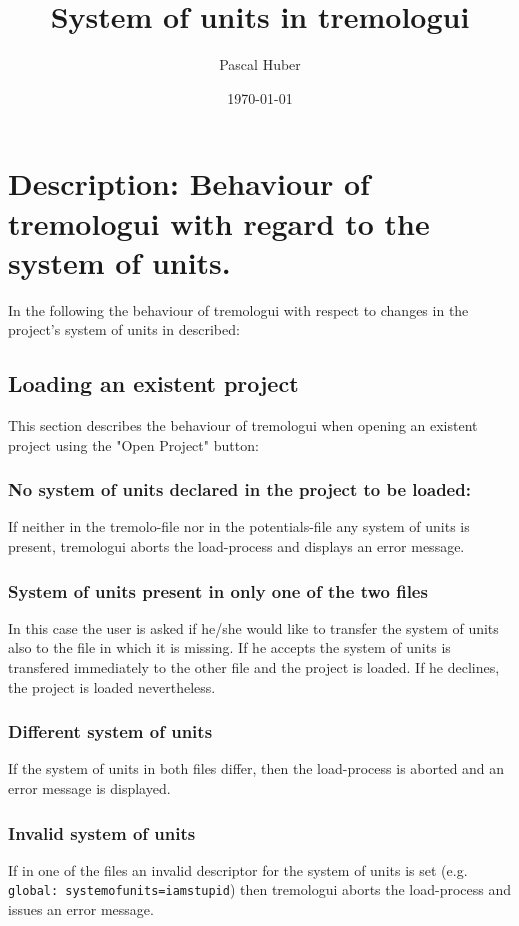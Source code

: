 \documentclass[11pt]{article}
\author{Pascal Huber}
\date{\today}
\title{System of units in tremologui}
\begin{document}
\maketitle
\tableofcontents

\section{Description: Behaviour of tremologui with regard to the system of units.}
\label{sec-1}
In the following the behaviour of tremologui with respect to changes in the
project's system of units in described:
\subsection{Loading an existent project}
\label{sec-1-1}
This section describes the behaviour of tremologui when opening an existent
project using the "Open Project" button:
\subsubsection{No system of units declared in the project to be loaded:}
\label{sec-1-1-1}
If neither in the tremolo-file nor in the potentials-file any system of units is
present, tremologui aborts the load-process and displays an error message.
\subsubsection{System of units present in only one of the two files}
\label{sec-1-1-2}
In this case the user is asked if he/she would like to transfer the system of
units also to the file in which it is missing. If he accepts the system of units
is transfered immediately to the other file and the project is loaded. If he
declines, the project is loaded nevertheless.
\subsubsection{Different system of units}
\label{sec-1-1-3}
If the system of units in both files differ, then the load-process is aborted
and an error message is displayed.
\subsubsection{Invalid system of units}
\label{sec-1-1-4}
If in one of the files an invalid descriptor for the system of units is set
(e.g. \texttt{global: systemofunits=iamstupid}) then tremologui aborts the load-process
and issues an error message.
\end{document}
